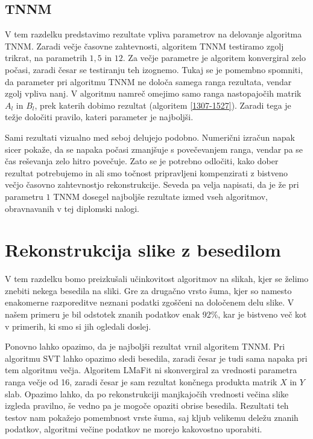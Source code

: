 \subsection{TNNM}
V tem razdelku predstavimo rezultate vpliva parametrov na delovanje algoritma TNNM. Zaradi večje časovne zahtevnosti, algoritem TNNM testiramo zgolj trikrat, na parametrih $1, 5$ in $12$. Za večje parametre je algoritem konvergiral zelo počasi, zaradi česar se testiranju teh izognemo. Tukaj se je pomembno spomniti, da parameter pri algoritmu TNNM ne določa samega ranga rezultata, vendar zgolj vpliva nanj.
V algoritmu namreč omejimo samo ranga nastopajočih matrik $A_l$ in $B_l$, prek katerih dobimo rezultat (algoritem \ref{1307-1527}). Zaradi tega je težje določiti pravilo, kateri parameter je najboljši.

\FloatBarrier


Sami rezultati vizualno med seboj delujejo podobno. Numerični izračun napak sicer pokaže, da se napaka počasi zmanjšuje s povečevanjem ranga, vendar pa se čas reševanja zelo hitro povečuje. Zato se je potrebno odločiti, kako dober rezultat potrebujemo in ali smo točnost pripravljeni kompenzirati z bistveno večjo časovno zahtevnostjo rekonstrukcije. Seveda pa velja napisati, da je že pri parametru $1$ TNNM dosegel najboljše rezultate izmed vseh algoritmov, obravnavanih v tej diplomski nalogi.

\section{Rekonstrukcija slike z besedilom} \label{1307-2254}
V tem razdelku bomo preizkušali učinkovitost algoritmov na slikah, kjer se želimo znebiti nekega besedila na sliki. Gre za drugačno vrsto šuma, kjer so namesto enakomerne razporeditve neznani podatki zgoščeni na določenem delu slike. V našem primeru je bil odstotek znanih podatkov enak 92\%, kar je bistveno več kot v primerih, ki smo si jih ogledali doslej.


Ponovno lahko opazimo, da je najboljši rezultat vrnil algoritem TNNM. Pri algoritmu SVT lahko opazimo sledi besedila, zaradi česar je tudi sama napaka pri tem algoritmu večja. Algoritem LMaFit ni skonvergiral za vrednosti parametra ranga večje od 16, zaradi česar je sam rezultat končnega produkta matrik $X$ in $Y$ slab. Opazimo lahko, da po rekonstrukciji  manjkajočih vrednosti večina slike izgleda pravilno, še vedno pa je mogoče opaziti obrise besedila.
Rezultati teh testov nam pokažejo pomembnost vrste šuma, saj kljub velikemu deležu znanih podatkov, algoritmi večine podatkov ne morejo kakovostno uporabiti.

